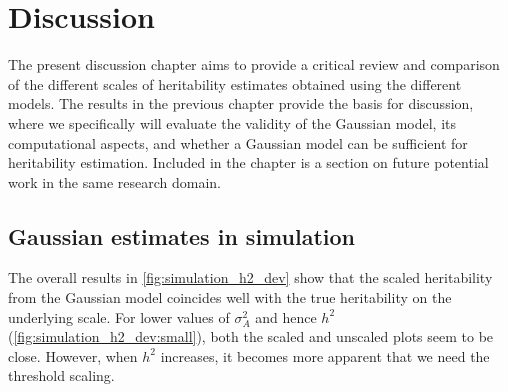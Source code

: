 \chapter{Discussion} \label{sec:discussion}
The present discussion chapter aims to provide a critical review and comparison of the different scales of heritability estimates obtained using the different models. The results in the previous chapter provide the basis for discussion, where we specifically will evaluate the validity of the Gaussian model, its computational aspects, and whether a Gaussian model can be sufficient for heritability estimation. Included in the chapter is a section on future potential work in the same research domain. 


\section{Gaussian estimates in simulation}
The overall results in \autoref{fig:simulation_h2_dev} show that the scaled heritability from the Gaussian model coincides well with the true heritability on the underlying scale. For lower values of $\sigma^2_A$ and hence $h^2$ (\autoref{fig:simulation_h2_dev:small}), both the scaled and unscaled plots seem to be close. However, when $h^2$ increases, it becomes more apparent that we need the threshold scaling.


